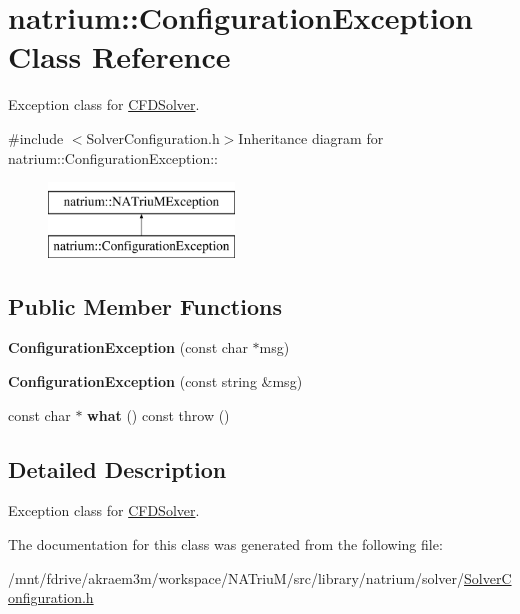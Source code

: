 \hypertarget{classnatrium_1_1ConfigurationException}{
\section{natrium::ConfigurationException Class Reference}
\label{classnatrium_1_1ConfigurationException}
}


Exception class for \hyperlink{classnatrium_1_1CFDSolver}{CFDSolver}.  


{\ttfamily \#include $<$SolverConfiguration.h$>$}Inheritance diagram for natrium::ConfigurationException::\begin{figure}[H]
\begin{center}
\leavevmode
\includegraphics[height=2cm]{classnatrium_1_1ConfigurationException}
\end{center}
\end{figure}
\subsection*{Public Member Functions}
\begin{DoxyCompactItemize}
\item 
\hypertarget{classnatrium_1_1ConfigurationException_ac9248a6224570c873784f201ef9ae34f}{
{\bfseries ConfigurationException} (const char $\ast$msg)}
\label{classnatrium_1_1ConfigurationException_ac9248a6224570c873784f201ef9ae34f}

\item 
\hypertarget{classnatrium_1_1ConfigurationException_a9f622f88d955e5c5e01719b7fcb273a6}{
{\bfseries ConfigurationException} (const string \&msg)}
\label{classnatrium_1_1ConfigurationException_a9f622f88d955e5c5e01719b7fcb273a6}

\item 
\hypertarget{classnatrium_1_1ConfigurationException_a48c72bd9bbae81e098a1f214899b3de6}{
const char $\ast$ {\bfseries what} () const   throw ()}
\label{classnatrium_1_1ConfigurationException_a48c72bd9bbae81e098a1f214899b3de6}

\end{DoxyCompactItemize}


\subsection{Detailed Description}
Exception class for \hyperlink{classnatrium_1_1CFDSolver}{CFDSolver}. 

The documentation for this class was generated from the following file:\begin{DoxyCompactItemize}
\item 
/mnt/fdrive/akraem3m/workspace/NATriuM/src/library/natrium/solver/\hyperlink{SolverConfiguration_8h}{SolverConfiguration.h}\end{DoxyCompactItemize}
